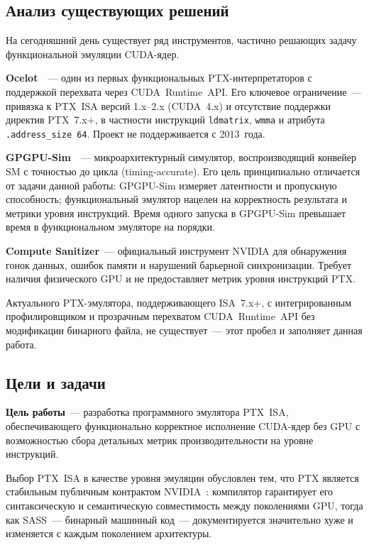 \subsection{Анализ существующих решений}

На сегодняшний день существует ряд инструментов, частично решающих
задачу функциональной эмуляции CUDA-ядер.

\textbf{Ocelot}~\cite{Diamos2010}~--- один из первых функциональных
PTX-интерпретаторов с поддержкой перехвата через CUDA~Runtime~API.
Его ключевое ограничение~--- привязка к PTX~ISA версий 1.x--2.x (CUDA~4.x)
и отсутствие поддержки директив PTX~7.x+, в частности инструкций
\texttt{ldmatrix}, \texttt{wmma} и атрибута \texttt{.address\_size~64}.
Проект не поддерживается с 2013~года.

\textbf{GPGPU-Sim}~\cite{Bakhoda2009}~--- микроархитектурный симулятор,
воспроизводящий конвейер SM с точностью до цикла (timing-accurate).
Его цель принципиально отличается от задачи данной работы: GPGPU-Sim
измеряет латентности и пропускную способность; функциональный
эмулятор нацелен на корректность результата и метрики уровня инструкций. Время одного запуска в GPGPU-Sim превышает
время в функциональном эмуляторе на порядки.

\textbf{Compute Sanitizer}~--- официальный инструмент NVIDIA
для обнаружения гонок данных, ошибок памяти и нарушений барьерной
синхронизации. Требует наличия физического GPU и не предоставляет
метрик уровня инструкций PTX.

Актуального PTX-эмулятора, поддерживающего ISA~7.x+, с интегрированным профилировщиком и прозрачным перехватом CUDA~Runtime~API без модификации бинарного файла, не существует~--- этот пробел и заполняет данная работа.

\subsection{Цели и задачи}

\textbf{Цель работы}~--- разработка программного эмулятора PTX~ISA,
обеспечивающего функционально корректное исполнение CUDA-ядер без GPU
с возможностью сбора детальных метрик производительности на уровне
инструкций.

Выбор PTX~ISA в качестве уровня эмуляции обусловлен тем, что PTX
является стабильным публичным контрактом NVIDIA~\cite{PTXISA}: компилятор гарантирует
его синтаксическую и семантическую совместимость между поколениями GPU,
тогда как SASS~--- бинарный машинный код~--- документируется значительно хуже
и изменяется с каждым поколением архитектуры.

